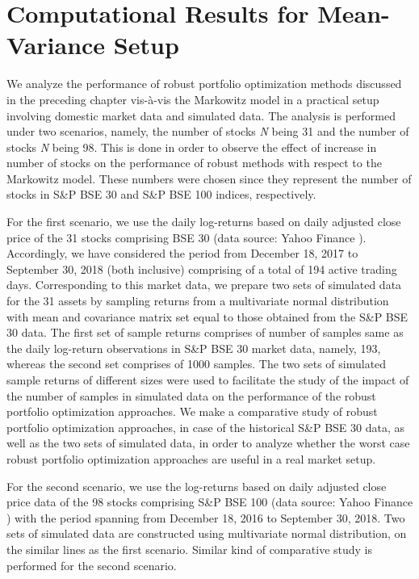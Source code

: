 \chapter{Computational Results for Mean-Variance Setup}

We analyze the performance of robust portfolio optimization methods discussed in the preceding chapter vis-\`a-vis the Markowitz model in a practical setup involving domestic market data and simulated data. The analysis is performed under two scenarios, namely, the number of stocks \textit{N} being 31 and the number of stocks \textit{N} being 98. This is done in order to observe the effect of increase in number of stocks on the performance of robust methods with respect to the Markowitz model. These numbers were chosen since they represent the number of stocks in S\&P BSE 30 and S\&P BSE 100 indices, respectively.

For the first scenario, we use the daily log-returns based on daily adjusted close price of the 31 stocks comprising BSE 30 (data source: Yahoo Finance \cite{yf}). Accordingly, we have considered the period from December 18, 2017 to September 30, 2018 (both inclusive) comprising of a total of 194 active trading days. Corresponding to this market data, we prepare two sets of simulated data for the 31 assets by sampling returns from a multivariate normal distribution with mean and covariance matrix set equal to those obtained from the S\&P BSE 30 data. The first set of sample returns comprises of number of samples same as the daily log-return observations in S\&P BSE 30 market data, namely, 193, whereas the second set comprises of 1000 samples. The two sets of simulated sample returns of different sizes were used to facilitate the study of the impact of the number of samples in simulated data on the performance of the robust portfolio optimization approaches. We make a comparative study of robust portfolio optimization approaches, in case of the historical S\&P BSE 30 data, as well as the two sets of simulated data, in order to analyze whether the worst case robust portfolio optimization approaches are useful in a real market setup.

For the second scenario, we use the log-returns based on daily adjusted close price data of the 98 stocks comprising S\&P BSE 100 (data source: Yahoo Finance \cite{yf}) with the period spanning from December 18, 2016 to September 30, 2018. Two sets of simulated data are constructed using multivariate normal distribution, on the similar lines as the first scenario. Similar kind of comparative study is performed for the second scenario.

